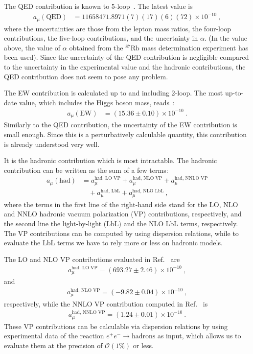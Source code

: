 The QED contribution is known to 5-loop~\cite{AKN17}. 
The latest value is
%
\begin{align}
 a_\mu(\text{QED}) &=
  11 658 471.8971 (7)(17)(6)(72) \times 10^{-10} ~,
\label{eq:a_mu_QED}
\end{align}
%
where the uncertainties are those from the lepton mass ratios,
the four-loop contributions, the five-loop contributions,
and the uncertainty in $\alpha$.  (In the value above, the
value of $\alpha$ obtained from the ${}^{87}\text{Rb}$ mass
determination experiment has been used).  Since the uncertainty
of the QED contribution is negligible compared to the uncertainty 
in the experimental value and the hadronic contributions,
the QED contribution does not seem to pose any problem.


The EW contribution is calculated up to and including
2-loop.  The most up-to-date value, which includes 
the Higgs boson mass, reads~\cite{Gnendiger}:
%
\begin{align}
 a_\mu(\text{EW}) &=  (15.36 \pm 0.10) \times 10^{-10} ~.
\label{eq:a_mu_EW}
\end{align}
%
Similarly to the QED contribution, the uncertainty of the EW
contribution is small enough.  Since this is a perturbatively
calculable quantity, this contribution is already understood
very well.

It is the hadronic contribution which is most intractable.
The hadronic contribution can be written as the sum of a 
few terms:
%
\begin{align}
   a_\mu(\text{had})
&= a_\mu^{\text{had, LO VP}} +  a_\mu^{\text{had, NLO VP}}
+  a_\mu^{\text{had, NNLO VP}} \nonumber \\
%
&\quad + a_\mu^{\text{had, LbL}} +  a_\mu^{\text{had, NLO LbL}}~,
%
\end{align}
%
where the terms in the first line of the right-hand side stand
for the LO, NLO and NNLO hadronic vacuum polarization (VP)
contributions, respectively, and the second line
the light-by-light (LbL) and the NLO LbL terms, respectively.
The VP contributions can be computed by using dispersion 
relations, while to evaluate the LbL terms we have to 
rely more or less on hadronic models.

The LO and NLO VP contributions evaluated in Ref.~\cite{KNT18}
are 
%
\begin{align}
 a_\mu^{\text{had, LO VP}}= (693.27 \pm 2.46) \times 10^{-10}~, 
\label{eq:a_mu_hadLOVP}
\end{align}
%
and
%
\begin{align}
a_\mu^{\text{had, NLO VP}}= (-9.82 \pm 0.04) \times 10^{-10}~, 
\label{eq:a_mu_hadNLOVP}
\end{align}
%
respectively, while the NNLO VP contribution computed 
in Ref.~\cite{Kurz-etal-hadNNLO} is
%
\begin{align}
a_\mu^{\text{had, NNLO VP}}= (1.24 \pm 0.01) \times 10^{-10}~.
\label{eq:a_mu_hadNNLOVP}
\end{align}
%
These VP contributions can be calculable via dispersion relations
by using experimental data of the reaction
$e^+e^- \to \text{hadrons}$ as input, 
which allows us to evaluate them at the precision of 
${\mathcal O}(1\%)$ or less.

